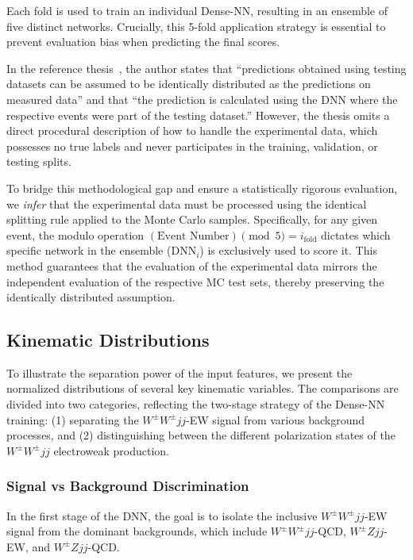 \documentclass[12pt]{article}
\begin{document}
        Each fold is used to train an individual Dense-NN, resulting in an ensemble of five distinct networks. Crucially, this 5-fold application strategy is essential to prevent evaluation bias when predicting the final scores. 

        In the reference thesis~\cite{stange2025longitudinal}, the author states that ``predictions obtained using testing datasets can be assumed to be identically distributed as the predictions on measured data'' and that ``the prediction is calculated using the DNN where the respective events were part of the testing dataset.'' However, the thesis omits a direct procedural description of how to handle the experimental data, which possesses no true labels and never participates in the training, validation, or testing splits. 

        To bridge this methodological gap and ensure a statistically rigorous evaluation, we \textit{infer} that the experimental data must be processed using the identical splitting rule applied to the Monte Carlo samples. Specifically, for any given event, the modulo operation $(\text{Event Number}) \pmod 5 = i_{\text{fold}}$ dictates which specific network in the ensemble ($\text{DNN}_{i}$) is exclusively used to score it. This method guarantees that the evaluation of the experimental data mirrors the independent evaluation of the respective MC test sets, thereby preserving the identically distributed assumption.


    \subsection{Kinematic Distributions}%
    \label{sub:kinematic_distributions}

        To illustrate the separation power of the input features, we present the normalized distributions of several key kinematic variables. The comparisons are divided into two categories, reflecting the two-stage strategy of the Dense-NN training: (1) separating the $W^{\pm}W^{\pm}jj$-EW signal from various background processes, and (2) distinguishing between the different polarization states of the $W^{\pm}W^{\pm}jj$ electroweak production.


        \subsubsection{Signal vs Background Discrimination}%
        \label{subs:signal_vs_background_discrimination}
            In the first stage of the DNN, the goal is to isolate the inclusive $W^{\pm}W^{\pm}jj$-EW signal from the dominant backgrounds, which include $W^{\pm}W^{\pm}jj$-QCD, $W^{\pm}Zjj$-EW, and $W^{\pm}Zjj$-QCD.
\end{document}
